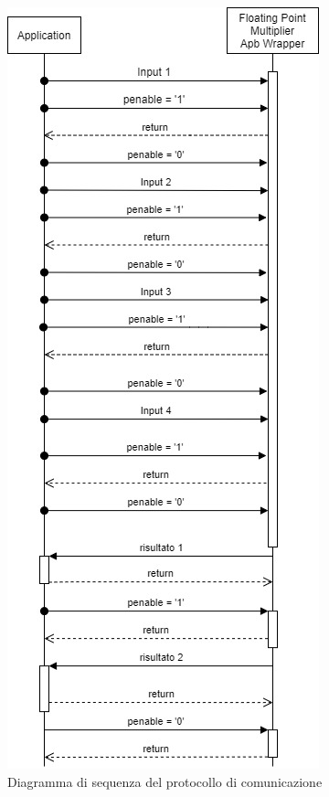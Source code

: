\documentclass[]{IEEEtran}
\begin{document}
	\begin{figure}[bt]
		\centering
		\includegraphics[width=\columnwidth]{figures/sequence}
		\caption{Diagramma di sequenza del protocollo di comunicazione}
		\label{fig:sequence}
	\end{figure}
	
\end{document}
